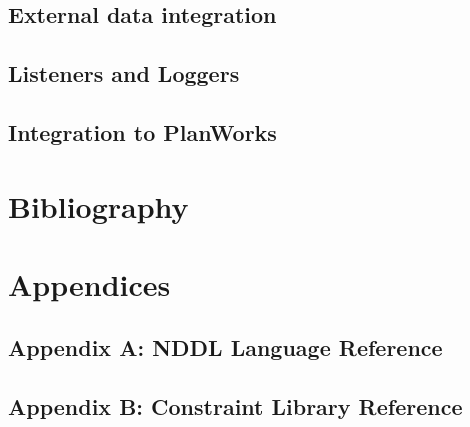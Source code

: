 \documentclass[10pt, letterpaper, twoside]{article}
\begin{document}
\subsection{External data integration}
\subsection{Listeners and Loggers}
\subsection{Integration to PlanWorks}

\section{Bibliography}

\section{Appendices}
\subsection{Appendix A: NDDL Language Reference}
\subsection{Appendix B: Constraint Library Reference}
\end{document}
